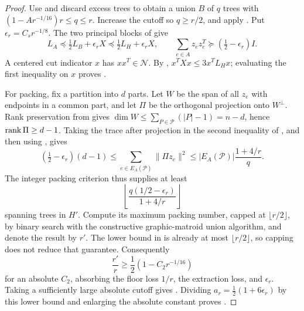 \begin{proof}
Use  and discard excess trees to obtain a union
$B$ of $q$ trees with $(1-Ar^{-1/16})r\le q\le r$.
Increase the cutoff so $q\ge r/2$, and apply
. Put $\epsilon_r=C_s r^{-1/8}$.
The two principal blocks of  give
\begin{equation}
 L_A\preceq\tfrac12L_B+\epsilon_rX
      \preceq\tfrac12L_H+\epsilon_rX,
       \qquad \sum_{e\in A}z_ez_e^T\succeq(\tfrac12-\epsilon_r)I.
 \label{eq:ta-two-blocks}
\end{equation}
A centered cut indicator $x$ has $xx^T\in\mathcal N$.
By , $x^TXx\le3x^TL_Hx$; evaluating the first inequality
on $x$ proves .

For packing, fix a partition into $d$ parts. Let $W$ be the span of all
$z_e$ with endpoints in a common part, and let $\Pi$ be the orthogonal
projection onto $W^\perp$. Rank preservation from 
gives $\dim W\le\sum_{P\in\mathcal P}(|P|-1)=n-d$, hence
$\operatorname{rank}\Pi\ge d-1$. Taking the trace after projection in the second
inequality of , and then using
, gives
\[
 (\tfrac12-\epsilon_r)(d-1)
       \le\sum_{e\in E_A(\mathcal P)}\|\Pi z_e\|^2
       \le |E_A(\mathcal P)|\frac{1+4/r}{q}.
\]
The integer packing criterion thus supplies at least
\begin{equation}
                     \left\lfloor
                       \frac{q(1/2-\epsilon_r)}{1+4/r}
                     \right\rfloor
 \label{eq:ta-projected-packing}
\end{equation}
spanning trees in $H'$.
Compute its maximum packing number, capped at $\lfloor r/2\rfloor$,
by binary search with the constructive graphic-matroid union algorithm,
and denote the result by $r'$. The lower bound in
 is already at most $\lfloor r/2\rfloor$,
so capping does not reduce that guarantee. Consequently
\[
 \frac{r'}r\ge\frac12(1-C_2r^{-1/16})
\]
for an absolute $C_2$, absorbing the floor loss $1/r$, the extraction
loss, and $\epsilon_r$. Taking a sufficiently large absolute cutoff
gives . Dividing
$a_r=\tfrac12(1+6\epsilon_r)$ by this lower bound and enlarging the
absolute constant proves .
\end{proof}

